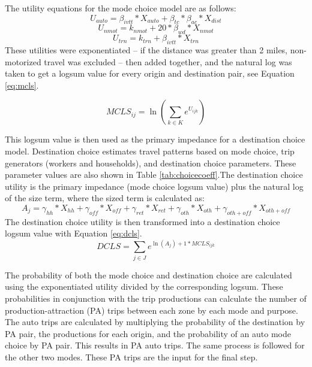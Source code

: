 \documentclass[fancy, masters,twoside]{byuthesis}
\begin{document}
The utility equations for the mode choice model are as follows:
\begin{equation}
U_{auto} = \beta_{ivtt} * X_{auto} + \beta_{tc} * \beta_{ac} * X_{dist}
\label{eq:driveutil}
\end{equation} \begin{equation}
U_{nmot} = k_{nmot} + 20 * \beta_{wd}*X_{nmot}
\label{eq:nonmoutil}
\end{equation} \begin{equation}
U_{trn} = k_{trn} + \beta_{ivtt} * X_{trn}
\label{eq:transutil}
\end{equation}
These utilities were exponentiated -- if the distance was greater than 2 miles, non-motorized travel was excluded -- then added together, and the natural log was taken to get a logsum value for every origin and destination pair, see Equation \eqref{eq:mcls}.

\begin{equation}
MCLS_{ij} = \ln(\sum_{k \in K} e^{U_{ijk}})
\label{eq:mcls}
\end{equation}

This logsum value is then used as the primary impedance for a destination choice model. Destination choice estimates travel patterns based on mode choice, trip generators (workers and households), and destination choice parameters. These parameter values are also shown in Table \ref{tab:choicecoeff}.The destination choice utility is the primary impedance (mode choice logsum value) plus the natural log of the size term, where the sized term is calculated as:
\begin{equation}
A_j = \gamma_{hh} * X_{hh} + \gamma_{off} * X_{off} + \gamma_{ret} * X_{ret} + \gamma_{oth} * X_{oth} + \gamma_{oth+off} * X_{oth+off}
\label{eq:dcsizeterm}
\end{equation}
The destination choice utility is then transformed into a destination choice logsum value with Equation \eqref{eq:dcls}.
\begin{equation}
DCLS = \sum_{j \in J} e^{\ln(A_j) + 1* MCLS_{ijk}}
\label{eq:dcls}
\end{equation}

The probability of both the mode choice and destination choice are calculated using the exponentiated utility divided by the corresponding logsum. These probabilities in conjunction with the trip productions can calculate the number of production-attraction (PA) trips between each zone by each mode and purpose. The auto trips are calculated by multiplying the probability of the destination by PA pair, the productions for each origin, and the probability of an auto mode choice by PA pair. This results in PA auto trips. The same process is followed for the other two modes. These PA trips are the input for the final step.
\end{document}
